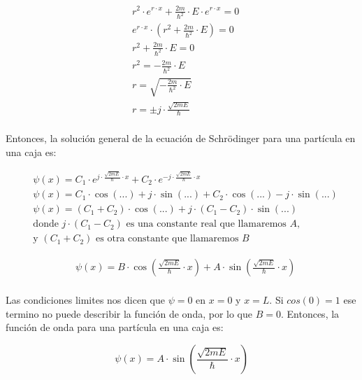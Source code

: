 \documentclass[a4paper]{article}
\begin{document}
        \begin{align*}
            &r^2 \cdot e^{r \cdot x} + \frac{2m}{\hbar^2} \cdot E \cdot e^{r \cdot x} = 0 \\
            &e^{r \cdot x} \cdot (r^2 + \frac{2m}{\hbar^2} \cdot E) = 0 \\
            &r^2 + \frac{2m}{\hbar^2} \cdot E = 0 \\
            &r^2 = -\frac{2m}{\hbar^2} \cdot E \\
            &r = \sqrt{-\frac{2m}{\hbar^2} \cdot E} \\
            &r = \pm j \cdot \frac{\sqrt{2mE}}{\hbar}\\
        \end{align*}

        \indent Entonces, la solución general de la ecuación de Schrödinger para una partícula en una caja es:

        \begin{align*}
            &\psi(x) =  C_1 \cdot e^{j \cdot \frac{\sqrt{2mE}}{\hbar} \cdot x} + C_2 \cdot e^{-j \cdot \frac{\sqrt{2mE}}{\hbar} \cdot x} \\
            &\psi(x) =  C_1 \cdot \cos(...) + j \cdot \sin(...) + C_2 \cdot\cos(...) - j \cdot \sin(...) \\
            &\psi(x) =  (C_1 + C_2) \cdot \cos(...) + j \cdot (C_1 - C_2) \cdot \sin(...) \\
            &\text{donde } j \cdot (C_1 - C_2) \text{ es una constante real que llamaremos } A, \\
            &\text{y } (C_1 + C_2) \text{ es otra constante que llamaremos } B
        \end{align*}

        \saltoPag
        \vspace{-10mm}

        \begin{align*}
            &\psi(x) = B \cdot \cos(\frac{\sqrt{2mE}}{\hbar} \cdot x) + A \cdot \sin(\frac{\sqrt{2mE}}{\hbar} \cdot x) \\
        \end{align*}
        \vspace{-5mm}

        \indent Las condiciones limites nos dicen que $\psi = 0$ en $x = 0$ y $x = L$. Si $cos (0) = 1$ ese termino no puede describir la función de onda, por lo que $B = 0$. Entonces, la función de onda para una partícula en una caja es:

        \begin{equation}
            \psi(x) = A \cdot \sin(\frac{\sqrt{2mE}}{\hbar} \cdot x)
        \end{equation}
\end{document}
